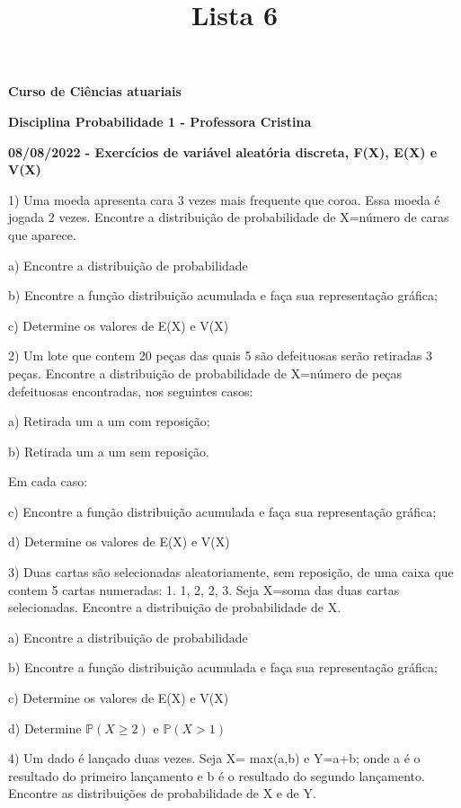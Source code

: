 \documentclass[12pt,a4paper]{article}
\title{Lista 6}
\date{}
\begin{document}
	
\maketitle
\begin{center}
\textbf{Curso de Ciências atuariais}

\textbf{Disciplina Probabilidade 1 - Professora Cristina}

\textbf{08/08/2022  - Exercícios de variável aleatória discreta, F(X), E(X) e V(X)}
\end{center}

\vspace{1cm}
1) Uma moeda apresenta cara 3 vezes mais frequente que coroa. Essa moeda é jogada 2 vezes. Encontre a distribuição de probabilidade de X=número de caras que aparece.

a) Encontre a distribuição de probabilidade

b) Encontre a função distribuição acumulada e faça sua representação gráfica;

c) Determine os valores de E(X) e V(X)

\vspace{1cm}
2) Um lote que contem 20 peças das quais 5 são defeituosas serão retiradas 3 peças. Encontre a distribuição de probabilidade de X=número de peças defeituosas encontradas, nos seguintes casos:

a) Retirada um a um com reposição;

b) Retirada um a um sem reposição.

Em cada caso:

c) Encontre a função distribuição acumulada e faça sua representação gráfica;

d) Determine os valores de E(X) e V(X)

\vspace{1cm}
3) Duas cartas são selecionadas aleatoriamente, sem reposição, de uma caixa que contem 5 cartas numeradas: 1. 1, 2, 2, 3. Seja X=soma das duas cartas selecionadas. Encontre a distribuição de probabilidade de X.

a) Encontre a distribuição de probabilidade

b) Encontre a função distribuição acumulada e faça sua 
representação gráfica;

c) Determine os valores de E(X) e V(X)

d) Determine $\mathbb{P}(X\geq{2})$ e $\mathbb{P}(X>1)$

\vspace{1cm}
4) Um dado é lançado duas vezes. Seja X= max(a,b) e Y=a+b; onde a é o resultado do primeiro lançamento e b é o resultado do segundo lançamento. Encontre as distribuições de probabilidade de X e de Y.
\end{document}
